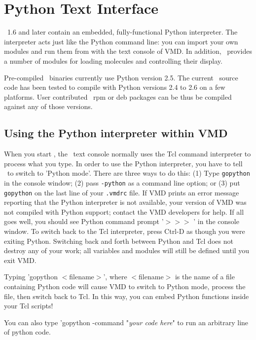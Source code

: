 
\chapter{Python Text Interface}
\label{ug:chapter:python}

\VMD\ 1.6 and later contain an embedded, fully-functional Python 
interpreter.  The interpreter acts just like the Python command line: you can 
import your own modules and run them from with the text console of VMD.  In 
addition,
\VMD\ provides a number of modules for loading molecules and controlling 
their display.  

Pre-compiled \VMD\ binaries currently use Python version 2.5. The current \VMD\ 
source code has been tested to compile with Python versions 2.4 to 2.6 on
a few platforms. User contributed \VMD\  rpm or deb packages can be thus be
compiled against any of those versions.
 
\section{Using the Python interpreter within VMD}

When you start \VMD, the \VMD\ text console normally uses the Tcl
command interpreter to process what you type.  In order to use the Python
interpreter, you have to tell \VMD\ to switch to 'Python mode'.  There are
three ways to do this: (1) Type {\tt gopython} in the console window; (2)
pass {\tt -python} as a command line option; or (3) put {\tt gopython} on
the last line of your {\tt .vmdrc} file.  If VMD prints an error message
reporting that the Python interpreter is not available, your version
of VMD was not compiled with Python support; contact the VMD developers
for help.  If all goes well, you should see Python command prompt '$>>>$
' in the console window.  To switch back to the Tcl interpreter, press
Ctrl-D as though you were exiting Python.  Switching back and forth
between Python and Tcl does not destroy any of your work; all variables
and modules will still be defined until you exit VMD.

Typing 'gopython $<$filename$>$', where $<$filename$>$ is the name of a file 
containing Python code will cause VMD to switch to Python mode, process the
file, then switch back to Tcl.  In this way, you can embed Python functions
inside your Tcl scripts! 

You can also type 'gopython -command "{\it your code here}" to run an 
arbitrary line of python code.

